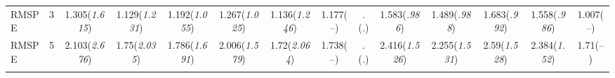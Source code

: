 \documentclass{article}
\begin{document}
\begin{table}[tbp]
{\begin{tabularx}{\textwidth}{lCCCCCCCCCCCCC}
RMSPE&3&1.305\newline (\emph{1.615})&1.129\newline (\emph{1.231})&1.192\newline (\emph{1.055})&1.267\newline (\emph{1.025})&1.136\newline (\emph{1.246})&1.177\newline (--)&.\newline (\emph{.})&1.583\newline (\emph{.986})&1.489\newline (\emph{.988})&1.683\newline (\emph{.992})&1.558\newline (\emph{.986})&1.007\newline (--) \tabularnewline
RMSPE&5&2.103\newline (\emph{2.676})&1.75\newline (\emph{2.035})&1.786\newline (\emph{1.691})&2.006\newline (\emph{1.579})&1.72\newline (\emph{2.064})&1.738\newline (--)&.\newline (\emph{.})&2.416\newline (\emph{1.526})&2.255\newline (\emph{1.531})&2.59\newline (\emph{1.528})&2.384\newline (\emph{1.52})&1.71\newline (--) \tabularnewline
\bottomrule \addlinespace[1.5ex]

\end{tabularx}
}
\end{table}
\end{document}
